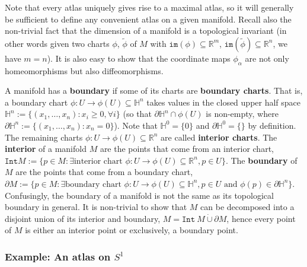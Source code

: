 \documentclass[a4paper]{article}
\theoremstyle{definition} \newtheorem*{definition}{Definition}
\theoremstyle{definition} \newtheorem*{definitions}{Definitions}
\theoremstyle{plain} \newtheorem{theorem}{Theorem}[section]
\theoremstyle{plain} \newtheorem{proposition}[theorem]{Proposition}
\theoremstyle{plain} \newtheorem{corollary}[theorem]{Corollary}
\theoremstyle{plain} \newtheorem{lemma}[theorem]{Lemma}
\theoremstyle{plain} \newtheorem{example}[theorem]{Example}
\newcommand{\defn}[1]{\textbf{#1}}
\newcommand{\realnos}{\mathbb{R}}
\begin{document}
Note that every atlas uniquely gives rise to a maximal atlas, so it will generally be sufficient to define any convenient atlas on a given manifold. Recall also the non-trivial fact that the dimension of a manifold is a topological invariant (in other words given two charts $\phi$, $\tilde{\phi}$ of $M$ with $\mathtt{im}(\phi)\subseteq \realnos^m$, $\mathtt{im}(\tilde{\phi})\subseteq \realnos^n$, we have $m=n$). It is also easy to show that the coordinate maps $\phi_\alpha$ are not only homeomorphisms but also diffeomorphisms. 

A manifold has a \defn{boundary} if some of its charts are \defn{boundary charts}. That is, a boundary chart $\phi:U\to \phi(U)\subseteq \mathbb{H}^n$ takes values in the closed upper half space $\mathbb{H}^n := \{(x_1, \ldots, x_n): x_i\geq 0, \forall i\}$ (so that $\partial \mathbb{H}^n \cap \phi(U)$ is non-empty, where $\partial \mathbb{H}^n := \{(x_1, \ldots, x_n): x_n=0\}$). Note that $\mathbb{H}^0 = \{0\}$ and $\partial \mathbb{H}^0 = \{\}$ by definition. The remaining charts $\phi:U\to \phi(U)\subseteq \realnos^n$ are called \defn{interior charts}. The \defn{interior} of a manifold $M$ are the points that come from an interior chart, $\texttt{Int} M := \{p\in M: \exists \textrm{interior chart } \phi:U\to \phi(U)\subseteq \realnos^n, p\in U \}$. The \defn{boundary} of $M$ are the points that come from a boundary chart, $\partial M:=\{p\in M: \exists \textrm{boundary chart } \phi:U\to \phi(U)\subseteq \mathbb{H}^n, p\in U \textrm{ and } \phi(p)\in \partial \mathbb{H}^n \}$. Confusingly, the boundary of a manifold is not the same as its topological boundary in general. It is non-trivial to show that $M$ can be decomposed into a disjoint union of its interior and boundary, $M = \mathtt{Int} \ M \mathbin{\dot{\cup}} \partial M$, hence every point of $M$ is either an interior point or exclusively, a boundary point.

\subsubsection{Example: An atlas on $S^1$}
\end{document}

